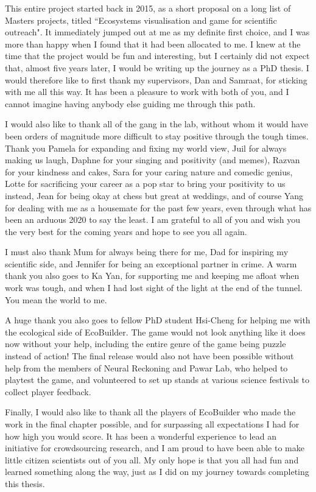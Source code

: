 \cleardoublepage


\begin{acknowledgements}

This entire project started back in 2015, as a short proposal on a long list of Masters projects, titled ``Ecosystems visualisation and game for scientific outreach". It immediately jumped out at me as my definite first choice, and I was more than happy when I found that it had been allocated to me. I knew at the time that the project would be fun and interesting, but I certainly did not expect that, almost five years later, I would be writing up the journey as a PhD thesis.
I would therefore like to first thank my supervisors, Dan and Samraat, for sticking with me all this way. It has been a pleasure to work with both of you, and I cannot imagine having anybody else guiding me through this path.

I would also like to thank all of the gang in the lab, without whom it would have been orders of magnitude more difficult to stay positive through the tough times. Thank you Pamela for expanding and fixing my world view, Juil for always making us laugh, Daphne for your singing and positivity (and memes), Razvan for your kindness and cakes, Sara for your caring nature and comedic genius, Lotte for sacrificing your career as a pop star to bring your positivity to us instead, Jean for being okay at chess but great at weddings, and of course Yang for dealing with me as a housemate for the past few years, even through what has been an arduous 2020 to say the least.
I am grateful to all of you and wish you the very best for the coming years and hope to see you all again.

I must also thank Mum for always being there for me, Dad for inspiring my scientific side, and Jennifer for being an exceptional partner in crime. A warm thank you also goes to Ka Yan, for supporting me and keeping me afloat when work was tough, and when I had lost sight of the light at the end of the tunnel. You mean the world to me.

A huge thank you also goes to fellow PhD student Hsi-Cheng for helping me with the ecological side of EcoBuilder. The game would not look anything like it does now without your help, including the entire genre of the game being puzzle instead of action!
The final release would also not have been possible without help from the members of Neural Reckoning and Pawar Lab, who helped to playtest the game, and volunteered to set up stands at various science festivals to collect player feedback.

Finally, I would also like to thank all the players of EcoBuilder who made the work in the final chapter possible, and for surpassing all expectations I had for how high you would score. It has been a wonderful experience to lead an initiative for crowdsourcing research, and I am proud to have been able to make little citizen scientists out of you all.
My only hope is that you all had fun and learned something along the way, just as I did on my journey towards completing this thesis.

\end{acknowledgements}